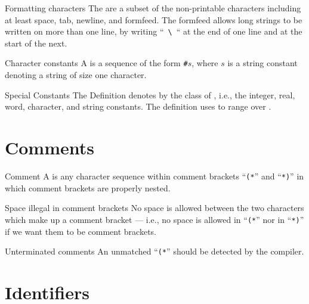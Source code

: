 \begin{definition}{Formatting characters}\label{defn:syntax-core:formatting-characters}
The  are a subset of the non-printable
characters including at least space, tab, newline, and formfeed. The
formfeed allows long strings to be written on more than one line, by
writing ``~\verb+\+~`` at the end of one line and at the start of the next.
\end{definition}

\begin{definition}{Character constants}
A  is a sequence of the form
\texttt{\#}$s$, where $s$ is a string constant denoting a string of
size one character.
\end{definition}

\begin{definition}{Special Constants}
The Definition denotes by {\SCon} the class of ,
i.e., the integer, real, word, character, and string constants. The
definition uses {\scon} to range over \SCon.
\end{definition}

\section{Comments}

\begin{definition}{Comment}\label{defn:syntax-core:comment}
A  is any character sequence within comment brackets
``\texttt{(*}'' and ``\texttt{*)}'' in which comment brackets are
properly nested.
\end{definition}

\begin{clause}{Space illegal in comment brackets}
No space is allowed between the two characters which make up a comment
bracket --- i.e., no space is allowed in ``\texttt{(*}'' nor in
``\texttt{*)}'' if we want them to be comment brackets.
\end{clause}

\begin{clause}{Unterminated comments}
An unmatched ``\texttt{(*}'' should be detected by the compiler.
\end{clause}

\section{Identifiers}

